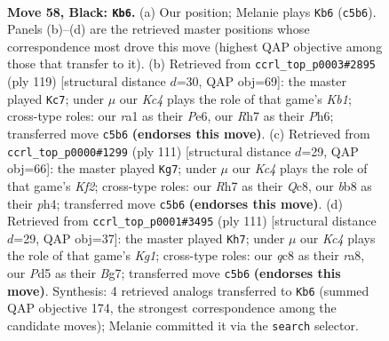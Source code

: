\documentclass[11pt]{article}
\begin{document}
\clearpage

\begin{figure}[p]\centering
\begin{subfigure}{0.46\textwidth}\centering
\resizebox{\linewidth}{!}{%
\newchessgame
\chessboard[
  setfen={1BQ5/7r/8/p1kp1p2/P6P/8/8/RN4K1 b - - 0 58},
  showmover=false,
  pgfstyle=straightmove, color=movearrow, markmove={c5-b6}
]}
\caption{}
\end{subfigure}\hfill
\begin{subfigure}{0.46\textwidth}\centering
\resizebox{\linewidth}{!}{%
\newchessgame
\chessboard[
  setfen={1k2Q3/p7/4p2p/3r4/8/P5PK/1P3r2/8 b - - 9 60},
  showmover=false,
  pgfstyle=straightmove, color=movearrow, markmove={b8-c7}
]}
\caption{}
\end{subfigure}
\\[4pt]
\begin{subfigure}{0.46\textwidth}\centering
\resizebox{\linewidth}{!}{%
\newchessgame
\chessboard[
  setfen={2q5/5k2/8/2p5/2P1pQ1P/5p2/2r5/1R3K2 b - - 3 56},
  showmover=false,
  pgfstyle=straightmove, color=movearrow, markmove={f7-g7}
]}
\caption{}
\end{subfigure}\hfill
\begin{subfigure}{0.46\textwidth}\centering
\resizebox{\linewidth}{!}{%
\newchessgame
\chessboard[
  setfen={R5k1/6b1/2p5/1p4PB/8/5pK1/P2r4/8 b - - 1 56},
  showmover=false,
  pgfstyle=straightmove, color=movearrow, markmove={g8-h7}
]}
\caption{}
\end{subfigure}
\caption{\textbf{Move 58, Black: \texttt{Kb6}.} (a) Our position; Melanie plays \texttt{Kb6} (\texttt{c5b6}). Panels (b)--(d) are the retrieved master positions whose correspondence most drove this move (highest QAP objective among those that transfer to it). (b) Retrieved from \texttt{ccrl\_top\_p0003\#2895} (ply 119) [structural distance $d$=30, QAP obj=69]: the master played \texttt{Kc7}; under $\mu$ our \emph{Kc4} plays the role of that game's \emph{Kb1}; cross-type roles: our \emph{r}a1 as their \emph{P}e6, our \emph{R}h7 as their \emph{P}h6; transferred move \texttt{c5b6} \textbf{(endorses this move)}. (c) Retrieved from \texttt{ccrl\_top\_p0000\#1299} (ply 111) [structural distance $d$=29, QAP obj=66]: the master played \texttt{Kg7}; under $\mu$ our \emph{Kc4} plays the role of that game's \emph{Kf2}; cross-type roles: our \emph{R}h7 as their \emph{Q}c8, our \emph{b}b8 as their \emph{p}h4; transferred move \texttt{c5b6} \textbf{(endorses this move)}. (d) Retrieved from \texttt{ccrl\_top\_p0001\#3495} (ply 111) [structural distance $d$=29, QAP obj=37]: the master played \texttt{Kh7}; under $\mu$ our \emph{Kc4} plays the role of that game's \emph{Kg1}; cross-type roles: our \emph{q}c8 as their \emph{r}a8, our \emph{P}d5 as their \emph{B}g7; transferred move \texttt{c5b6} \textbf{(endorses this move)}. Synthesis: 4 retrieved analogs transferred to \texttt{Kb6} (summed QAP objective 174, the strongest correspondence among the candidate moves); Melanie committed it via the \texttt{search} selector.}
\label{fig:thought-m115}
\end{figure}
\end{document}

